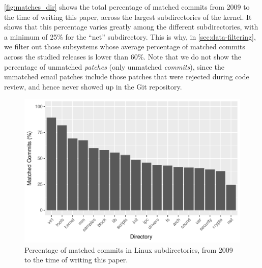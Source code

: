 \autoref{fig:matches_dir} shows the total percentage of matched commits from 2009 to the time of writing this paper, across the largest subdirectories of the kernel. It shows that this percentage varies greatly among the different subdirectories, with a minimum of 25\% for the ``net'' subdirectory. This is why, in \autoref{sec:data-filtering}, we filter out those subsystems whose average percentage of matched commits across the studied releases is lower than 60\%. Note that we do not show the percentage of unmatched {\em patches} (only unmatched {\em commits}), since the unmatched email patches include those patches that were rejected during code review, and hence never showed up in the Git repository.






% 

\begin{figure}[t]
  \centering
  \includegraphics[scale=.6]{plots/matched_commits_dir}
  \caption{Percentage of matched commits in Linux subdirectories, from 2009 to the time of writing this paper.}
  \label{fig:matches_dir}
\end{figure}




%



